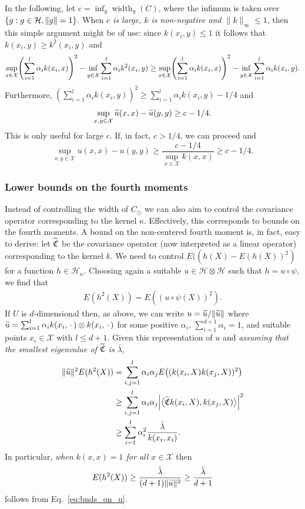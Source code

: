 \documentclass[10pt]{amsart}
\theoremstyle{definition}\newtheorem{defi}[theo]{Definition}\newtheorem{rema}[theo]{Remark}\newtheorem{exam}[theo]{Example}\newtheorem{exem}[theo]{Example}\newtheorem{nota}[theo]{Notation}
\theoremstyle{remark}
\DeclareMathOperator*{\infd}{inf\vphantom{p}}
\DeclareMathOperator{\diam}{width}
\newcommand{\X}{\mathcal{X}}
\newcommand{\cH}{\mathcal{H}}
\newcommand{\fkC}{\mathfrak{C}}
\let\oldtilde\tilde
\renewcommand*{\tilde}[1]{\mathchoice{\widetilde{#1}}{\widetilde{#1}}{\oldtilde{#1}}{\oldtilde{#1}}}
\let\originalleft\left
\let\originalright\right
\renewcommand{\left}{\mathopen{}\mathclose\bgroup\originalleft}
\renewcommand{\right}{\aftergroup\egroup\originalright}
\begin{document}
In the following, let $c = \inf_g \diam_g(C)$, where the infimum is taken over $\{g : g\in \cH,\linebreak \|g\|=1\}$. When \emph{$c$ is large, $k$ is non-negative and $\|k\|_\infty \leq 1$}, then this simple argument might be of use: since $k(x_i,y) \leq 1$ it follows that $k(x_i,y) \geq k^2(x_i,y)$ and
\[
\sup_{x \in \X} \left( \sum_{i=1}^{l} \alpha_i k(x_i,x) \right)^2 - \infd_{y \in \X} \sum_{i=1}^{l} \alpha_i k^2(x_i,y) \geq \sup_{x \in \X} \left(\sum_{i=1}^{l} \alpha_i k(x_i,x) \right)^2 - \infd_{y \in \X} \sum_{i=1}^{l} \alpha_i k(x_i,y).
\]
Furthermore, $(\sum_{i=1}^{l} \alpha_i k(x_i,y))^2 \geq \sum_{i=1}^{l} \alpha_i k(x_i,y) - 1/4$ and
\[
\sup_{x,y \in \X} \tilde u(x,x) - \tilde u(y,y) \geq c - 1/4.
\]
This is only useful for large $c$. If, in fact, $c > 1/4$, we can proceed and
\[
\sup_{x,y \in \X} u(x,x) - u(y,y) \geq \frac{c - 1/4}{\sup_{x \in \X} k(x,x)} \geq c - 1/4.
\]


\subsubsection{Lower bounds on the fourth moments}

Instead of controlling the width of $C_\odot$ we can also aim to control the covariance operator corresponding to the kernel $\kappa$. Effectively, this corresponds to bounds on the fourth moments. A bound on the non-centered fourth moment is, in fact, easy to derive: let $\tilde{\fkC}$ be the covariance operator (now interpreted as a linear operator) corresponding to the kernel $k$. We need to control $E((h(X) - E(h(X))^2)$ for a function $h \in \cH_\kappa$. Choosing again a suitable $u \in \cH \otimes \cH$ such that $h = u \circ \psi$, we find that
\begin{align*}
E(h^2(X)) = E((u \circ \psi(X))^2).
\end{align*}
If $U$ is $d$-dimensional then, as above, we can write $u = \tilde u/\|\tilde u\|$ where $\tilde u =\linebreak \sum_{i=1}^{l} \alpha_i k(x_i,\,\cdot\,) \otimes k(x_i,\,\cdot\,)$ for some positive $\alpha_i$, $\sum_{i=1}^{d+1} \alpha_i =1$, and suitable points $x_i \in \X$ with $l\leq d+1$. Given this representation of $u$ and \emph{assuming that the smallest eigenvalue of $\tilde{\fkC}$ is $\bar \lambda$},
\begin{align*}
\|\tilde u\|^2 E(h^2(X)) &= \sum_{i,j=1}^{l}\alpha_i \alpha_j E\bigl((k(x_i,X)k(x_j,X))^2\bigr)\\
&\geq \sum_{i,j=1}^{l}\alpha_i \alpha_j \left|\bigl\langle \tilde{\fkC} k(x_i,X),k(x_j,X) \bigr\rangle\right|^2 \\
&\geq \sum_{i=1}^{l} \alpha_i^2 \frac{\bar \lambda}{k(x_i,x_i)}.
\end{align*}
In particular, \emph{when $k(x,x) = 1$ for all $x \in \X$} then
\[
E(h^2(X)) \geq \frac{\bar \lambda}{(d+1) \|\tilde u\|^2} \geq \frac{\bar \lambda}{d+1}
\]
follows from Eq.~\eqref{eq:bnds_on_u}.
\end{document}
